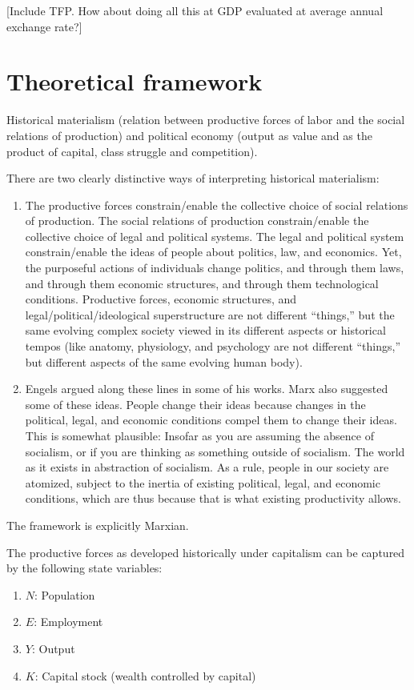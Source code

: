 \documentclass[pt=12]{article}
\begin{document}
[Include TFP.  How about doing all this at GDP evaluated at average annual exchange rate?]

\section{Theoretical framework}

Historical materialism (relation between productive forces of labor and the social relations of production) and political economy (output as value and as the product of capital, class struggle and competition). 

There are two clearly distinctive ways of interpreting historical materialism:
\begin{enumerate}
\item The productive forces constrain/enable the collective choice of social relations of production.  The social relations of production constrain/enable the collective choice of legal and political systems.  The legal and political system constrain/enable the ideas of people about politics, law, and economics.  Yet, the purposeful actions of individuals change politics, and through them laws, and through them economic structures, and through them technological conditions.  Productive forces, economic structures, and legal/political/ideological superstructure are not different ``things,'' but the same evolving complex society viewed in its different aspects or historical tempos (like anatomy, physiology, and psychology are not different ``things,'' but different aspects of the same evolving human body).
\item Engels argued along these lines in some of his works.  Marx also suggested some of these ideas. People change their ideas because changes in the political, legal, and economic conditions compel them to change their ideas.  This is somewhat plausible: Insofar as you are assuming the absence of socialism, or if you are thinking as something outside of socialism.  The world as it exists in abstraction of socialism.  As a rule, people in our society are atomized, subject to the inertia of existing political, legal, and economic conditions, which are thus because that is what existing productivity allows.

\end{enumerate}

The framework is explicitly Marxian.

The productive forces as developed historically under capitalism can be captured by the following state variables:
\begin{enumerate}
\item $N$: Population
\item $E$: Employment
\item $Y$: Output
\item $K$: Capital stock (wealth controlled by capital)
\end{enumerate}
\end{document}
